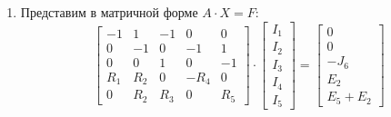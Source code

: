 \begin{enumerate}
	\item Представим в матричной форме \( A \cdot X = F \):
	      \[
		      \begin{bmatrix}
			      -1  & 1   & -1  & 0    & 0   \\
			      0   & -1  & 0   & -1   & 1   \\
			      0   & 0   & 1   & 0    & -1  \\
			      R_1 & R_2 & 0   & -R_4 & 0   \\
			      0   & R_2 & R_3 & 0    & R_5
		      \end{bmatrix}
		      \cdot
		      \begin{bmatrix}
			      I_1 \\
			      I_2 \\
			      I_3 \\
			      I_4 \\
			      I_5
		      \end{bmatrix}
		      =
		      \begin{bmatrix}
			      0    \\
			      0    \\
			      -J_6 \\
			      E_2  \\
			      E_5 + E_2
		      \end{bmatrix}
	      \]


\end{enumerate}
